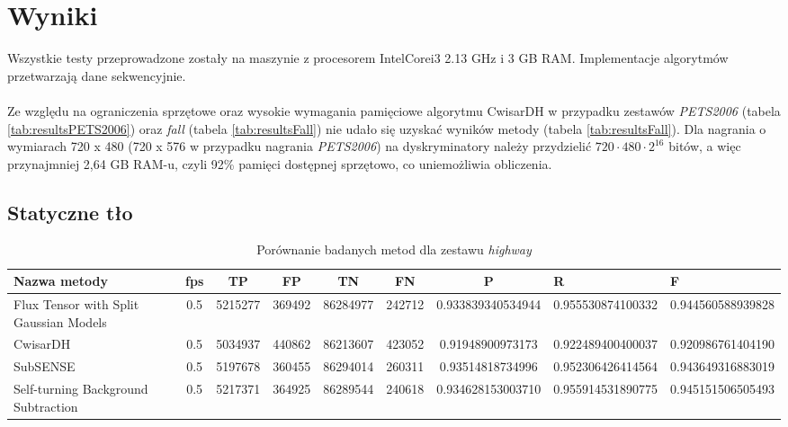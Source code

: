 \section{Wyniki}
Wszystkie testy przeprowadzone zostały na maszynie z procesorem Intel\textregistered Core\texttrademark i3 2.13 GHz i 3 GB RAM. Implementacje algorytmów przetwarzają dane sekwencyjnie.
\paragraph{}
Ze względu na ograniczenia sprzętowe oraz wysokie wymagania pamięciowe algorytmu CwisarDH w przypadku zestawów \textit{PETS2006} (tabela \ref{tab:resultsPETS2006}) oraz \textit{fall} (tabela \ref{tab:resultsFall}) nie udało się uzyskać wyników metody (tabela \ref{tab:resultsFall}). Dla nagrania o wymiarach 720 x 480 (720 x 576 w przypadku nagrania \textit{PETS2006}) na dyskryminatory należy przydzielić $720 \cdot 480 \cdot 2^{16}$ bitów, a więc przynajmniej 2,64 GB RAM-u, czyli 92\% pamięci dostępnej sprzętowo, co uniemożliwia obliczenia.

\subsection{Statyczne tło}


\begin{table}[h]
\caption{Porównanie badanych metod dla zestawu \textit{highway}}
\label{tab:resultsHighway}
\centering
\begin{tabular}{|l*{6}{|c}|}
  \hline 
  \textbf{Nazwa metody} & \textbf{fps} & \textbf{TP} & \textbf{FP} & \textbf{TN} & \textbf{FN} & \textbf{P} & \textbf{R} & \textbf{F}\\
  \hline
  Flux Tensor with Split Gaussian Models & 0.5 & 5215277 & 369492 & 86284977 & 242712 & 0.933839340534944 & 0.955530874100332 & 0.944560588939828\\
  \hline
  CwisarDH & 0.5 & 5034937 & 440862 & 86213607 & 423052 & 0.91948900973173 & 0.922489400400037 & 0.920986761404190 \\
  \hline
  SubSENSE & 0.5 & 5197678 & 360455 & 86294014 & 260311 & 0.93514818734996 & 0.952306426414564 & 0.943649316883019 \\
  \hline
  Self-turning Background Subtraction & 0.5 & 5217371 & 364925 & 86289544 & 240618 & 0.934628153003710 & 0.955914531890775 & 0.945151506505493 \\
  \hline
\end{tabular}
\end{table}

